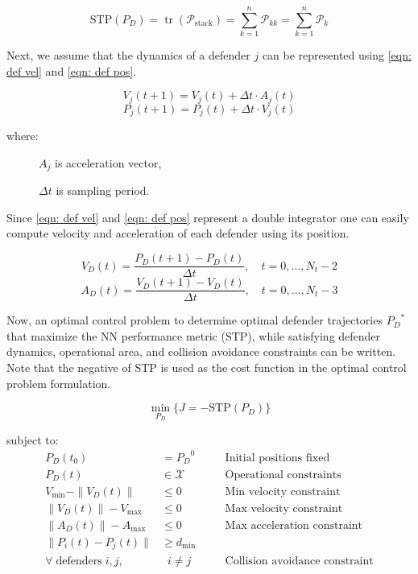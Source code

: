 \documentclass[journal]{IEEEtran} %
\begin{document}
\[
\text{STP}(P_D) = \operatorname{tr}(\mathcal{P}_{\text{stack}}) = \sum_{k=1}^{n} \mathcal{P}_{kk} =\sum_{k=1}^{n} \mathcal{P}_k
\]

Next, we assume that the dynamics of a defender \( j \) can be represented using \eqref{eqn: def vel} and \eqref{eqn: def pos}.

\begin{equation}
\label{eqn: def vel}
V_j(t+1) = V_j(t) + \Delta t \cdot A_j(t)
\end{equation}
\begin{equation}
\label{eqn: def pos}
P_j(t+1) = P_j(t) + \Delta t \cdot V_j(t)
\end{equation}

where:
\begin{description}
    \item[] \(A_j \) is acceleration  vector,
    \item[] \( \Delta t \) is sampling period.
\end{description}
\vspace{\baselineskip}

Since \eqref{eqn: def vel} and \eqref{eqn: def pos} represent a double integrator one can easily compute velocity and acceleration of each defender using its position.

\[
V_D(t) = \frac{P_D(t+1) - P_D(t)}{\Delta t}, \quad t = 0, \ldots, N_t-2
\]
\[
A_D(t) = \frac{V_D(t+1) - V_D(t)}{\Delta t}, \quad t = 0, \ldots, N_t-3
\]

Now, an optimal control problem to determine optimal defender trajectories \( {P_D}^* \) that maximize the NN performance metric (\( \text{STP} \)), while satisfying defender dynamics, operational area, and collision avoidance constraints can be written. Note that the negative of STP is used as the cost function in the optimal control problem formulation. 

\[
\min_{P_D} \{J = -\text{STP}(P_D)\}
\]

subject to:
\[
\begin{alignedat}{2}
P_D(t_0) &= {P_D}^0 &\quad &\text{Initial positions fixed} \\
P_D(t) &\in \mathcal{X} &\quad &\text{Operational constraints} \\
V_{\min} - \|V_D(t)\| &\leq 0 &\quad &\text{Min velocity constraint} \\
\|V_D(t)\| - V_{\max} &\leq 0 &\quad &\text{Max velocity constraint} \\
\|A_D(t)\| - A_{\max} &\leq 0 &\quad &\text{Max acceleration constraint} \\
\| P_i(t) - P_j(t)\| &\ge d_{\min}& \\ \forall \;\text{defenders} \;i,j, &\;\;i \ne j 
&\quad &\text{Collision avoidance constraint}
\end{alignedat}
\]
\vspace{\baselineskip}
\end{document}

